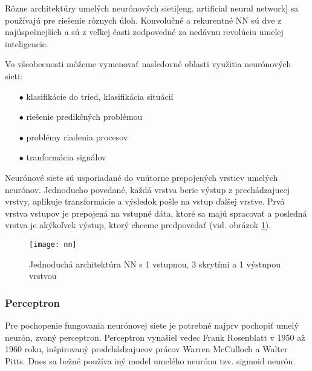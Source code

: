 Rôzne architektúry umelých neurónových sieti[eng. artificial neural network] sa používajú pre riešenie rôznych úloh.
Konvolučné a rekurentné NN sú dve z najúspešnejších a sú z veľkej časti zodpovedné za nedávnu revolúciu umelej inteligencie\cite{odkaz:CorrectionOfImageOrentation}.

Vo všeobecnosti môžeme vymenovať nasledovné oblasti využitia neurónových sieti\cite{odkaz:NNIntroduction}:
\begin{enumerate}
    \item[$\bullet$] klasifikácie do tried, klasifikácia situácií
    \item[$\bullet$] riešenie predikčných problémou
    \item[$\bullet$] problémy riadenia procesov
    \item[$\bullet$] tranformácia signálov
\end{enumerate}

Neurónové siete sú usporiadané do vnútorne prepojených vrstiev umelých neurónov.
Jednoducho povedané, každá vrstva berie výstup z prechádzajucej vrstvy, aplikuje transformácie a výsledok pošle na vstup ďalšej vrstve.
Prvá vrstva vstupov je prepojená na vstupné dáta, ktoré sa majú spracovať a posledná vrstva je akýkoľvek výstup, ktorý chceme predpovedať \cite{odkaz:CorrectionOfImageOrentation} (vid. obrázok \ref{pic:NNExample}).
\begin{figure}[H]
	\centering
	\texttt{[image: nn]}
	\caption{Jednoduchá architektúra NN s 1 vstupnou, 3 skrytími a 1 výstupou vrstvou\cite{odkaz:CorrectionOfImageOrentation}}
	\label{pic:NNExample}
\end{figure}

\subsubsection{Perceptron}
Pre pochopenie fungovania neurónovej siete je potrebné najprv pochopiť umelý neurón, zvaný perceptron.
Perceptron vynašiel vedec Frank Rosenblatt v 1950 až 1960 roku, inšpirovaný predchádzajucov prácov Warren McCulloch a Walter Pitts.
Dnes sa bežné používa iný model umelého neurónu tzv. sigmoid neurón\cite{odkaz:HandwrittenDigitRecognision}.

